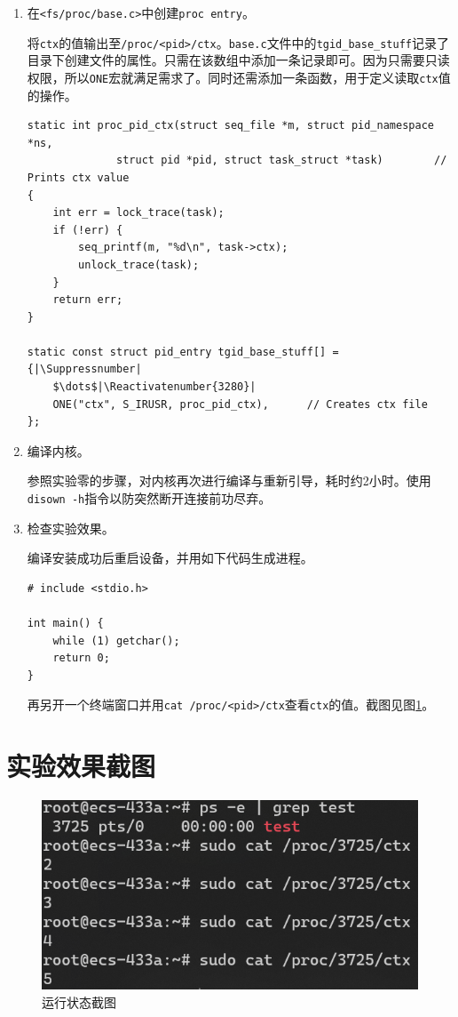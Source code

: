 \documentclass[UTF8]{ctexrep}
\makeatletter
\let\origthelstnumber\thelstnumber
\newcommand*\Suppressnumber{%
  \lst@AddToHook{OnNewLine}{%
    \let\thelstnumber\relax%
     \advance\c@lstnumber-\@ne\relax%
    }%
}
\newcommand*\Reactivatenumber[1]{%
  \setcounter{lstnumber}{\numexpr#1-1\relax}
  \lst@AddToHook{OnNewLine}{%
   \let\thelstnumber\origthelstnumber%
   \refstepcounter{lstnumber}
  }%
}
\makeatother
\begin{document}
\begin{enumerate}
        \item 在\texttt{<fs/proc/base.c>}中创建\texttt{proc entry}。
        
        将\texttt{ctx}的值输出至\texttt{/proc/<pid>/ctx}。\texttt{base.c}文件中的\texttt{tgid\_base\_stuff}记录了目录下创建文件的属性。只需在该数组中添加一条记录即可。因为只需要只读权限，所以\texttt{ONE}宏就满足需求了。同时还需添加一条函数，用于定义读取\texttt{ctx}值的操作。

\begin{lstlisting}[firstnumber=3159]
static int proc_pid_ctx(struct seq_file *m, struct pid_namespace *ns,
			  struct pid *pid, struct task_struct *task)        // Prints ctx value
{
	int err = lock_trace(task);
	if (!err) {
		seq_printf(m, "%d\n", task->ctx);
		unlock_trace(task);
	}
	return err;
}

static const struct pid_entry tgid_base_stuff[] = {|\Suppressnumber|
    $\dots$|\Reactivatenumber{3280}| 
    ONE("ctx", S_IRUSR, proc_pid_ctx),      // Creates ctx file
};
\end{lstlisting}

        \item 编译内核。
        
        参照实验零的步骤，对内核再次进行编译与重新引导，耗时约2小时。使用\texttt{disown -h}指令以防突然断开连接前功尽弃。

        \item 检查实验效果。
        
        编译安装成功后重启设备，并用如下代码生成进程。

\begin{lstlisting}
# include <stdio.h>

int main() {
    while (1) getchar();
    return 0;
}
\end{lstlisting}

        再另开一个终端窗口并用\texttt{cat /proc/<pid>/ctx}查看\texttt{ctx}的值。截图见图\ref{fig:screenshot}。\\
    \end{enumerate}

    \section{实验效果截图}

    \begin{figure}[h!]
        \centering
        \includegraphics{images/screenshot.png}
        \caption{运行状态截图}
        \label{fig:screenshot}
    \end{figure}
\end{document}
